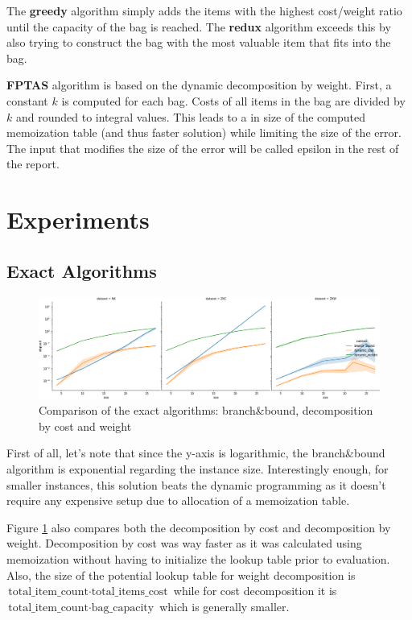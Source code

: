 \documentclass[a4paper,10pt]{article}
\begin{document}
The \textbf{greedy} algorithm simply adds the items with the highest cost/weight ratio until the capacity of the bag is reached. The \textbf{redux} algorithm exceeds this by also trying to construct the bag with the most valuable item that fits into the bag.

\textbf{FPTAS} algorithm is based on the dynamic decomposition by weight. First, a constant $k$ is computed for each bag. Costs of all items in the bag are divided by $k$ and rounded to integral values. This leads to a in size of the computed memoization table (and thus faster solution) while limiting the size of the error. The input that modifies the size of the error will be called epsilon in the rest of the report.

\section{Experiments}

\subsection{Exact Algorithms}

\begin{figure}[!htb]
	\centering
  	\includegraphics[width=\textwidth]{images/exacts_comparison.png}
	\caption{Comparison of the exact algorithms: branch\&bound, decomposition by cost and weight}
	\label{exacts_comparison}
\end{figure}

First of all, let's note that since the y-axis is logarithmic, the branch\&bound algorithm is exponential regarding the instance size. Interestingly enough, for smaller instances, this solution beats the dynamic programming as it doesn't require any expensive setup due to allocation of a memoization table.

Figure \ref{exacts_comparison} also compares both the decomposition by cost and decomposition by weight. Decomposition by cost was way faster as it was calculated using memoization without having to initialize the lookup table prior to evaluation. Also, the size of the potential lookup table for weight decomposition is $\textrm{total\_item\_count} \cdot \textrm{total\_items\_cost}$ while for cost decomposition it is $\textrm{total\_item\_count} \cdot \textrm{bag\_capacity}$ which is generally smaller. 
\end{document}
